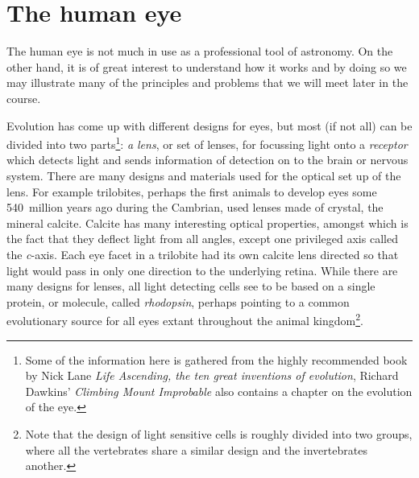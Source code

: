 %
\chapter{The human eye}
The human eye is not much in use as a professional tool of
astronomy. On the other hand, it is of great interest to understand how it
works and by doing so we may illustrate many of the principles and
problems that we will meet later in the course.

Evolution has come up with different designs for eyes, but most (if
not all) can be divided into two parts\footnote{Some of the
  information here is gathered from the highly recommended book by
  Nick Lane {\it Life Ascending, the ten great inventions of
    evolution}, Richard Dawkins' {\it Climbing Mount
    Improbable} also contains a chapter on the evolution of the eye.}:
{\it a lens}, or set of lenses, for
focussing light onto a {\it receptor} which detects light and sends
information of detection on to the brain or nervous system. There are
many designs and materials used for the optical set up of the
lens. For example trilobites, perhaps the first animals to develop
eyes some 540~million years ago during the Cambrian, used lenses made
of crystal, the mineral calcite. Calcite has many interesting optical
properties, amongst which is the fact that they deflect light from all
angles, except one privileged axis called the {\it c}-axis. Each eye
facet in a trilobite had its own calcite lens directed so that light
would pass in only one direction to the underlying retina. While there
are many designs for lenses, all light detecting cells see to be based
on a single protein, or molecule, called {\it rhodopsin}, perhaps
pointing to a common evolutionary source for all eyes extant
throughout the animal kingdom\footnote{Note that the design
  of light sensitive cells is roughly divided into two groups, where
  all the vertebrates share a similar design and the invertebrates another.}.

